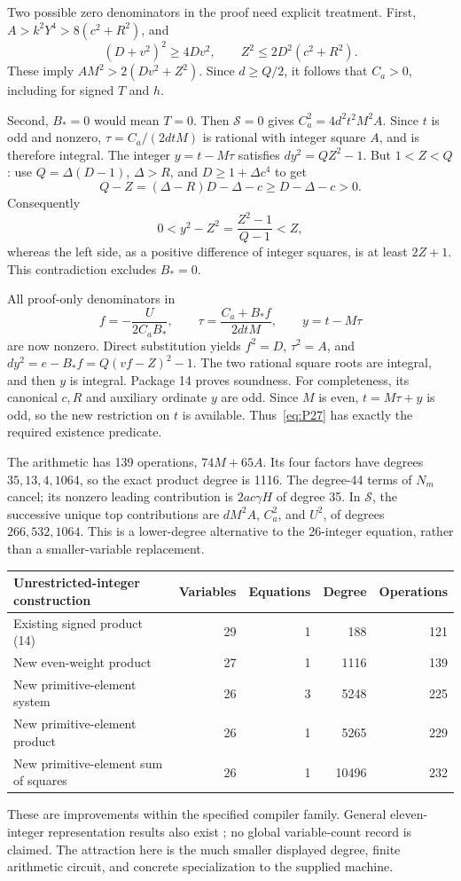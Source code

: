 Two possible zero denominators in the proof need explicit treatment.
First, $A>k^2Y^4>8(c^2+R^2)$, and
\[
(D+v^2)^2\ge4Dv^2,\qquad
Z^2\le2D^2(c^2+R^2).
\]
These imply $AM^2>2(Dv^2+Z^2)$.  Since $d\ge Q/2$, it follows
that $C_a>0$, including for signed $T$ and $h$.

Second, $B_*=0$ would mean $T=0$.  Then $\mathcal S=0$ gives
$C_a^2=4d^2t^2M^2A$.  Since $t$ is odd and nonzero,
$\tau=C_a/(2dtM)$ is rational with integer square $A$, and is therefore
integral.  The integer $y=t-M\tau$ satisfies
$dy^2=QZ^2-1$.  But $1<Z<Q$: use $Q=\Delta(D-1)$,
$\Delta>R$, and $D\ge1+\Delta c^4$ to get
\[
Q-Z=(\Delta-R)D-\Delta-c\ge D-\Delta-c>0.
\]
Consequently
\[
0<y^2-Z^2=\frac{Z^2-1}{Q-1}<Z,
\]
whereas the left side, as a positive difference of integer squares,
is at least $2Z+1$.  This contradiction excludes $B_*=0$.

All proof-only denominators in
\[
f=-\frac{U}{2C_aB_*},\qquad
\tau=\frac{C_a+B_*f}{2dtM},\qquad y=t-M\tau
\]
are now nonzero.  Direct substitution yields $f^2=D$, $\tau^2=A$,
and $dy^2=e-B_*f=Q(vf-Z)^2-1$.  The two rational square roots are
integral, and then $y$ is integral.  Package 14 proves soundness.
For completeness, its canonical $c,R$ and auxiliary ordinate $y$ are
odd.  Since $M$ is even, $t=M\tau+y$ is odd, so the new restriction
on $t$ is available.  Thus~\eqref{eq:P27} has exactly the required
existence predicate.

The arithmetic has 139 operations, $74M+65A$.  Its four factors have
degrees $35,13,4,1064$, so the exact product degree is 1116.
The degree-44 terms of $N_m$ cancel; its nonzero leading contribution
is $2ac\gamma H$ of degree 35.  In $\mathcal S$, the successive
unique top contributions are $dM^2A$, $C_a^2$, and $U^2$, of degrees
$266,532,1064$.  This is a lower-degree alternative to the
26-integer equation, rather than a smaller-variable replacement.

\begin{center}\small
\begin{tabular}{lrrrr}
\toprule
Unrestricted-integer construction & Variables & Equations & Degree & Operations\\
\midrule
Existing signed product (14) &29&1&188&121\\
New even-weight product &27&1&1116&139\\
New primitive-element system &26&3&5248&225\\
New primitive-element product &26&1&5265&229\\
New primitive-element sum of squares &26&1&10496&232\\
\bottomrule
\end{tabular}
\end{center}

These are improvements within the specified compiler family.
General eleven-integer representation results also exist
\cite{BayerDavid2025,BayerEtAl2025}; no global variable-count record is
claimed.  The attraction here is the much smaller displayed degree,
finite arithmetic circuit, and concrete specialization to the supplied
machine.
